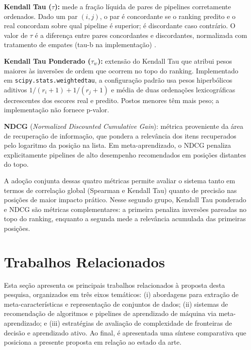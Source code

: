 \textbf{Kendall Tau ($\tau$):} mede a fração líquida de pares de pipelines corretamente ordenados. Dado um par $(i, j)$, o par é concordante se o ranking predito e o real concordam sobre qual pipeline é superior; é discordante caso contrário. O valor de $\tau$ é a diferença entre pares concordantes e discordantes, normalizada com tratamento de empates (tau-b na implementação) .

\textbf{Kendall Tau Ponderado ($\tau_w$):} extensão do Kendall Tau que atribui pesos maiores às inversões de ordem que ocorrem no topo do ranking. Implementado em \texttt{scipy.stats.weightedtau}, a configuração padrão usa pesos hiperbólicos aditivos $1/(r_i+1)+1/(r_j+1)$ e média de duas ordenações lexicográficas decrescentes dos escores real e predito. Postos menores têm mais peso; a implementação não fornece p-valor.

\textbf{NDCG} (\textit{Normalized Discounted Cumulative Gain}): métrica proveniente da área de recuperação de informação, que pondera a relevância dos itens recuperados pelo logaritmo da posição na lista. Em meta-aprendizado, o NDCG penaliza explicitamente pipelines de alto desempenho recomendados em posições distantes do topo.

A adoção conjunta dessas quatro métricas permite avaliar o sistema tanto em termos de correlação global (Spearman e Kendall Tau) quanto de precisão nas posições de maior impacto prático. Nesse segundo grupo, Kendall Tau ponderado e NDCG são métricas complementares: a primeira penaliza inversões pareadas no topo do ranking, enquanto a segunda mede a relevância acumulada das primeiras posições.

\section{Trabalhos Relacionados}
\label{sec:trabalhosRelacionados}

Esta seção apresenta os principais trabalhos relacionados à proposta desta pesquisa, organizados em três eixos temáticos: (i) abordagens para extração de meta-características e representação de conjuntos de dados; (ii) sistemas de recomendação de algoritmos e pipelines de aprendizado de máquina via meta-aprendizado; e (iii) estratégias de avaliação de complexidade de fronteiras de decisão e aprendizado ativo. Ao final, é apresentada uma síntese comparativa que posiciona a presente proposta em relação ao estado da arte.

